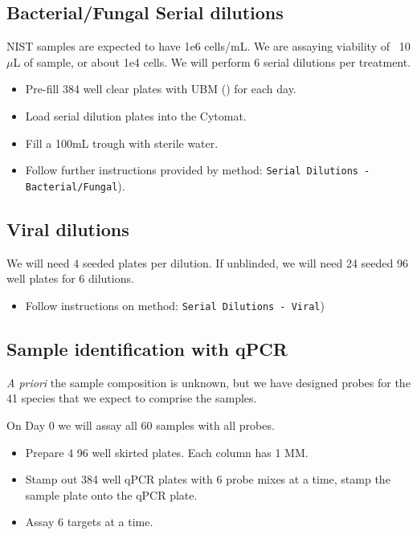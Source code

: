 \documentclass{article}
\begin{document}
\subsection{Bacterial/Fungal Serial dilutions}
\label{sec:serial-dil-bacterial}
NIST samples are expected to have 1e6 cells/mL. We are assaying viability of ~10$\mu$L of sample, or about 1e4 cells. We will perform 6 serial dilutions per treatment.

\begin{itemize}
\item Pre-fill 384 well clear plates with UBM () for each day.
\item  Load serial dilution plates into the Cytomat. 
\item Fill a 100mL trough with sterile water.
\item Follow further instructions  provided by method: \texttt{Serial Dilutions - Bacterial/Fungal}).
\end{itemize}

\subsection{Viral dilutions}
We will need 4 seeded plates per dilution. If unblinded, we will need 24 seeded 96 well plates for 6 dilutions.
\label{sec:serial-dil-viral}
\begin{itemize}
\item Follow instructions on method: \texttt{Serial Dilutions - Viral})
\end{itemize}


\subsection{Sample identification with qPCR }
\label{sec:sample-ident}
\textit{A priori} the sample composition is unknown, but we have designed probes for the 41 species that we expect to comprise the samples.

On Day 0 we will assay all 60 samples with all probes. 

\begin{itemize}
\item Prepare 4 96 well skirted plates. Each column has 1 MM.
\item Stamp out 384 well qPCR plates with 6 probe mixes at a time, stamp the sample plate onto the qPCR plate.
\item Assay 6 targets at a time.
\end{itemize}
\end{document}
